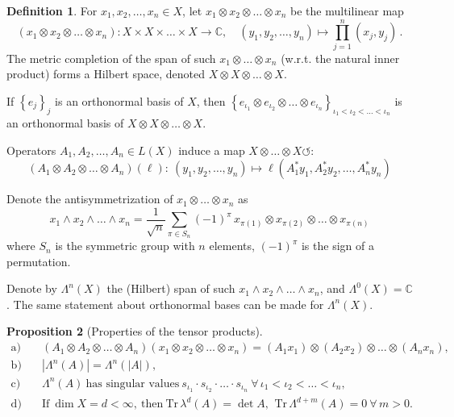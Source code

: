 \documentclass[a4paper]{article}
\newcommand{\Tr}{\textrm{Tr}\,}
\newcommand{\bbC}{\mathbb{C}}
\theoremstyle{definition}
\newtheorem{definition}{Definition}[section]
\newtheorem{proposition}[definition]{Proposition}
\theoremstyle{remark}
\theoremstyle{remark}
\begin{document}
\begin{definition}
    For $x_1, x_2, \ldots, x_n \in X$, let $x_1 \otimes x_2 \otimes \ldots \otimes x_n$ be the multilinear map 
    \begin{equation}
        (x_1 \otimes x_2 \otimes \ldots \otimes x_n) : X \times X \times \ldots \times X \to \bbC, \quad (y_1, y_2, \ldots, y_n) \mapsto \prod_{j=1}^{n} (x_j, y_j) \,. 
    \end{equation}
    The metric completion of the span of such $x_1 \otimes \ldots \otimes x_n$ (w.r.t. the natural inner product) forms a Hilbert space, denoted $X \otimes X \otimes \ldots \otimes X$. 

    If $\left\{ e_j \right\}_j$ is an orthonormal basis of $X$, then $\left\{ e_{\iota_1} \otimes e_{\iota_2} \otimes \ldots \otimes e_{\iota_n} \right\}_{\iota_1 < \iota_2 < \ldots < \iota_n}$ is an orthonormal basis of $X \otimes X \otimes \ldots \otimes X$. 

    Operators $A_1, A_2, \ldots, A_n \in L(X)$ induce a map $X \otimes \ldots \otimes X \circlearrowleft$: 
    \begin{equation}
        (A_1 \otimes A_2 \otimes \ldots \otimes A_n)(\ell) :\  (y_1, y_2, \ldots, y_n) \mapsto \ell (A_1^* y_1, A_2^* y_2, \ldots, A_n^* y_n)
    \end{equation}

    Denote the antisymmetrization of $x_1 \otimes \ldots \otimes x_n$ as 
    \begin{equation}
        x_1 \wedge x_2 \wedge \ldots \wedge x_n = \frac{1}{\sqrt{n}}  \sum_{\pi \in S_n} (-1)^\pi\, x_{\pi (1)} \otimes x_{\pi (2)} \otimes \ldots \otimes x_{\pi (n)} 
    \end{equation}
    where $S_n$ is the symmetric group with $n$ elements, $(-1)^\pi$ is the sign of a permutation. 

    Denote by $\Lambda^n (X)$ the (Hilbert) span of such $x_1 \wedge x_2 \wedge \ldots \wedge x_n$, and $\Lambda^0 (X) = \bbC$. The same statement about orthonormal bases can be made for $\Lambda^n (X)$. 
\end{definition}

\begin{proposition}[Properties of the tensor products] 
    \begin{align}
        \text{a)} &\quad (A_1 \otimes A_2 \otimes \ldots \otimes A_n) (x_1 \otimes x_2 \otimes \ldots \otimes x_n) = (A_1 x_1) \otimes (A_2 x_2) \otimes \ldots \otimes (A_n x_n), \\
        \text{b)} &\quad | \Lambda^n (A) | = \Lambda^n (|A|), \\
        \text{c)} &\quad \Lambda^n (A)\ \text{has singular values}\ s_{\iota_1} \cdot s_{\iota_2} \cdot \ldots \cdot s_{\iota_n}\ \forall\, \iota_1 < \iota_2 < \ldots < \iota_n, \\
        \text{d)} &\quad \text{If}\ \dim X = d < \infty,\ \text{then}\ \Tr \lambda^d (A) = \det A,\,\ \Tr \Lambda^{d+m} (A) = 0\ \forall\, m > 0. 
    \end{align}

\end{proposition}
\end{document}

